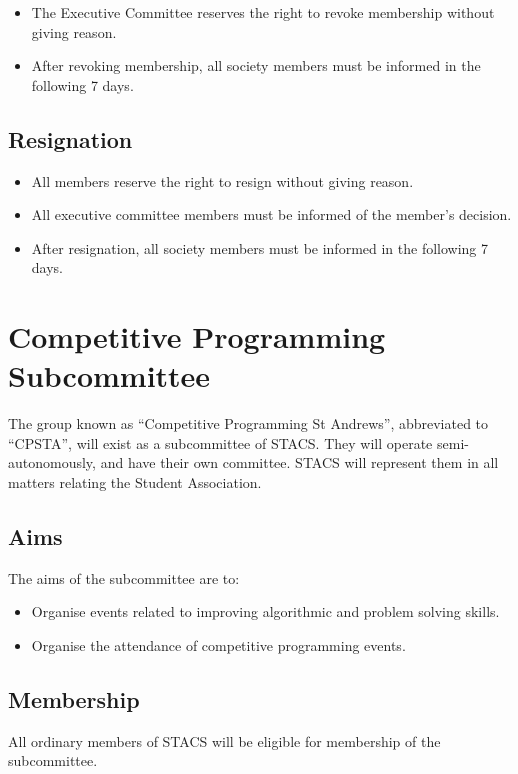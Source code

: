\documentclass{article}
\begin{document}
\begin{itemize}
    \item The Executive Committee reserves the right to revoke membership without giving reason.
    \item After revoking membership, all society members must be informed in the following 7 days.
\end{itemize}

\subsection{Resignation}

\begin{itemize}
    \item All members reserve the right to resign without giving reason.
    \item All executive committee members must be informed of the member’s decision.
    \item After resignation, all society members must be informed in the following 7 days.
\end{itemize}
\section{Competitive Programming Subcommittee}
    The group known as ``Competitive Programming St Andrews'', abbreviated to ``CPSTA'',  will exist as a subcommittee of STACS. They will operate semi-autonomously, and have their own committee. STACS will represent them in all matters relating the Student Association.
        \subsection{Aims}
        The aims of the subcommittee are to:
            \begin{itemize}
                \item Organise events related to improving algorithmic and problem solving skills.
                \item Organise the attendance of competitive programming events.
            \end{itemize}
        \subsection{Membership}
            All ordinary members of STACS will be eligible for membership of the subcommittee.
\end{document}

